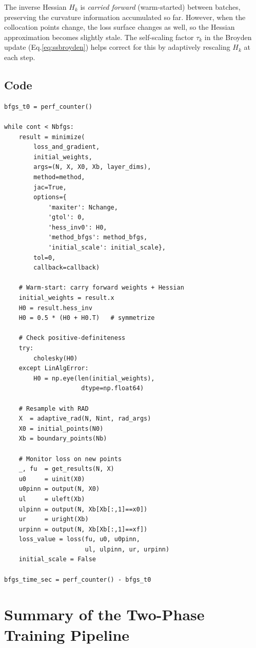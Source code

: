 \documentclass[11pt,a4paper]{article}
\begin{document}
The inverse Hessian $H_k$ is \emph{carried forward} (warm-started)
between batches, preserving the curvature information accumulated so
far.  However, when the collocation points change, the loss surface
changes as well, so the Hessian approximation becomes slightly stale.
The self-scaling factor $\tau_k$ in the Broyden update
(Eq.\eqref{eq:ssbroyden}) helps correct for this by adaptively
rescaling $H_k$ at each step.

\subsection*{Code}

\begin{lstlisting}
bfgs_t0 = perf_counter()

while cont < Nbfgs:
    result = minimize(
        loss_and_gradient,
        initial_weights,
        args=(N, X, X0, Xb, layer_dims),
        method=method,
        jac=True,
        options={
            'maxiter': Nchange,
            'gtol': 0,
            'hess_inv0': H0,
            'method_bfgs': method_bfgs,
            'initial_scale': initial_scale},
        tol=0,
        callback=callback)

    # Warm-start: carry forward weights + Hessian
    initial_weights = result.x
    H0 = result.hess_inv
    H0 = 0.5 * (H0 + H0.T)   # symmetrize

    # Check positive-definiteness
    try:
        cholesky(H0)
    except LinAlgError:
        H0 = np.eye(len(initial_weights),
                     dtype=np.float64)

    # Resample with RAD
    X  = adaptive_rad(N, Nint, rad_args)
    X0 = initial_points(N0)
    Xb = boundary_points(Nb)

    # Monitor loss on new points
    _, fu  = get_results(N, X)
    u0     = uinit(X0)
    u0pinn = output(N, X0)
    ul     = uleft(Xb)
    ulpinn = output(N, Xb[Xb[:,1]==x0])
    ur     = uright(Xb)
    urpinn = output(N, Xb[Xb[:,1]==xf])
    loss_value = loss(fu, u0, u0pinn,
                      ul, ulpinn, ur, urpinn)
    initial_scale = False

bfgs_time_sec = perf_counter() - bfgs_t0
\end{lstlisting}


\section{Summary of the Two-Phase Training Pipeline}
\end{document}
